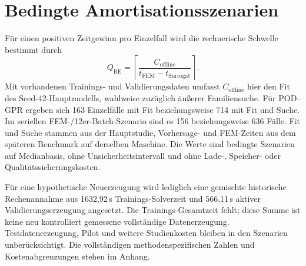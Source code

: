 \section{Bedingte Amortisationsszenarien}
Für einen positiven Zeitgewinn pro Einzelfall wird die rechnerische Schwelle bestimmt durch
\begin{equation}
 Q_{\mathrm{BE}}=\left\lceil\frac{C_{\mathrm{offline}}}{t_{\mathrm{FEM}}-t_{\mathrm{Surrogat}}}\right\rceil.
\end{equation}
Mit vorhandenen Trainings- und Validierungsdaten umfasst $C_{\mathrm{offline}}$ hier den Fit des Seed-42-Hauptmodells, wahlweise zuzüglich äußerer Familiensuche. Für POD--GPR ergeben sich 163 Einzelfälle mit Fit beziehungsweise 714 mit Fit und Suche. Im seriellen FEM-/12er-Batch-Szenario sind es 156 beziehungsweise 636 Fälle. Fit und Suche stammen aus der Hauptstudie, Vorhersage- und FEM-Zeiten aus dem späteren Benchmark auf derselben Maschine. Die Werte sind bedingte Szenarien auf Medianbasis, ohne Unsicherheitsintervall und ohne Lade-, Speicher- oder Qualitätssicherungskosten.

Für eine hypothetische Neuerzeugung wird lediglich eine gemischte historische Rechenannahme aus 1632,92\,s Trainings-Solverzeit und 566,11\,s aktiver Validierungserzeugung angesetzt. Die Trainings-Gesamtzeit fehlt; diese Summe ist keine neu kontrolliert gemessene vollständige Datenerzeugung. Testdatenerzeugung, Pilot und weitere Studienkosten bleiben in den Szenarien unberücksichtigt. Die vollständigen methodenspezifischen Zahlen und Kostenabgrenzungen stehen im Anhang.
